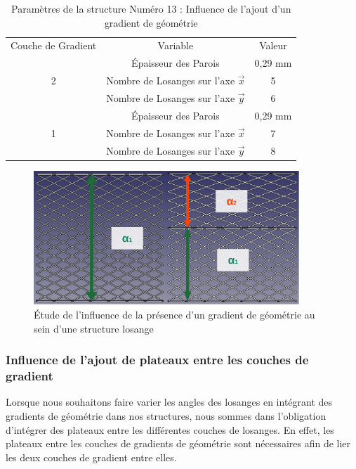 \documentclass[a4paper]{article}
\begin{document}
	\begin{table}[H]
		\centering
		\begin{tabular}{|c|c|c|}
			\hline
			\rowcolor{Gray}
			\multicolumn{3}{c}{Structure à gradient de géométrie : Structure 13}\\\hline
			\rowcolor{Gray}
			Couche de Gradient & Variable & Valeur\\
			\hline\hline
			& \textcolor[rgb]{1,0,0}{Épaisseur des Parois} & \textcolor[rgb]{1,0,0}{0,29 mm}\\
			\textcolor[rgb]{1,0,0}{2} & \textcolor[rgb]{1,0,0}{Nombre de Losanges sur l'axe $\vec{x}$} & \textcolor[rgb]{1,0,0}{5}\\
			& \textcolor[rgb]{1,0,0}{Nombre de Losanges sur l'axe $\vec{y}$} & \textcolor[rgb]{1,0,0}{6}\\
			\hline
			& \textcolor[rgb]{0,0.5,0}{Épaisseur des Parois} & \textcolor[rgb]{0,0.5,0}{0,29 mm}\\
			\textcolor[rgb]{0,0.5,0}{1} & \textcolor[rgb]{0,0.5,0}{Nombre de Losanges sur l'axe $\vec{x}$} & \textcolor[rgb]{0,0.5,0}{7}\\
			& \textcolor[rgb]{0,0.5,0}{Nombre de Losanges sur l'axe $\vec{y}$} & \textcolor[rgb]{0,0.5,0}{8}\\
			\hline
		\end{tabular}
		\caption{Paramètres de la structure Numéro 13 : Influence de l'ajout d'un gradient de géométrie}
	\end{table}
	
	\begin{figure}[H]
		\centering
		\includegraphics[width=10cm]{Images/6/gradgeom/gradgeom.pdf}
		\caption{Étude de l’influence de la présence d'un gradient de géométrie au sein d'une structure losange}
		\label{gradgeom}
	\end{figure}
	\newpage
	
	\subsubsection{Influence de l'ajout de plateaux entre les couches de gradient}
	\label{plateaux_partie}
	\hspace{0.5cm}Lorsque nous souhaitons faire varier les angles des losanges en intégrant des gradients de géométrie dans nos structures, nous sommes dans l’obligation d’intégrer des plateaux entre les différentes couches de losanges. En effet, les plateaux entre les couches de gradients de géométrie sont nécessaires afin de lier les deux couches de gradient entre elles.
	
\end{document}
